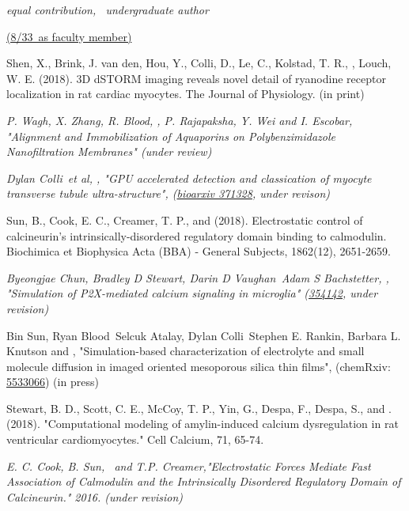\centerline{\sl * equal contribution,  \ug\ undergraduate author}
\vspace{10pt}
\newcommand\total{33} %
\centerline{ \uline{(8/\total\ as faculty member)}}
\begin{etaremune} \itemsep 2pt %
\item Shen, X., Brink, J. van den, Hou, Y., Colli, D., Le, C., Kolstad, T. R., \pmkh, Louch, W. E. (2018). 3D dSTORM imaging reveals novel detail of ryanodine receptor localization in rat cardiac myocytes. The Journal of Physiology. (in print)
\item \textit{P. Wagh, X. Zhang, R. Blood\ug, \pmkh, P. Rajapaksha, Y. Wei and I. Escobar, 
"Alignment and Immobilization of Aquaporins on Polybenzimidazole Nanofiltration Membranes" (under review)}
\item \textit{Dylan Colli\ug\ et al, \pmkh,
"GPU accelerated detection and classication of myocyte transverse tubule ultra-structure",
(\href{https://www.biorxiv.org/content/early/2018/07/17/371328}{bioarxiv 371328}, under revison)}
\item Sun, B., Cook, E. C., Creamer, T. P., and \pmkh (2018). Electrostatic control of calcineurin’s intrinsically-disordered regulatory domain binding to calmodulin. Biochimica et Biophysica Acta (BBA) - General Subjects, 1862(12), 2651-2659. 
\item \textit{Byeongjae Chun, Bradley D Stewart, Darin D Vaughan\ug\, Adam S Bachstetter, \pmkh,
"Simulation of P2X-mediated calcium signaling in microglia" 
(\href{https://www.biorxiv.org/content/early/2018/06/24/354142}{354142}, under revision)}
\item Bin Sun, Ryan Blood\ug\, Selcuk Atalay, Dylan Colli\ug\, Stephen E. Rankin, Barbara L. Knutson and \pmkh, "Simulation-based characterization of electrolyte and small molecule diffusion in imaged oriented mesoporous silica thin films", 
(chemRxiv: \href{https://doi.org/10.26434/chemrxiv.5533066.v1}{5533066}) (in press)
\item Stewart, B. D., Scott, C. E., McCoy, T. P., Yin, G., Despa, F., Despa, S., and \pmkh. (2018). "Computational modeling of amylin-induced calcium dysregulation in rat ventricular cardiomyocytes." Cell Calcium, 71, 65-74. 
\item \textit{E. C. Cook, B. Sun, \pmkh\ and T.P. Creamer,"Electrostatic Forces Mediate Fast Association of Calmodulin and the Intrinsically Disordered Regulatory Domain of Calcineurin." 2016.  (under revision)}

\end{etaremune}
